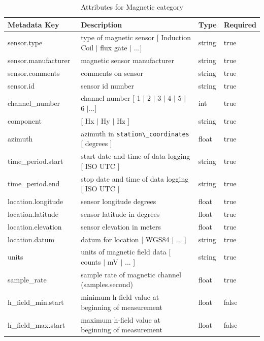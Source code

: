 \documentclass{article}
\begin{document}
\begin{table}[htb!]
    \caption[Attributes for Magnetic Channel]{Attributes for Magnetic category}
    \begin{tabular}{|l|p{3in}|l|l|}
        \hline
        \textbf{Metadata Key} & \textbf{Description} & \textbf{Type} & \textbf{Required} \\ \hline
        sensor.type\ & type of magnetic sensor [ Induction Coil $|$ flux gate $|$ ...] & string & true \\ \hline
        sensor.manufacturer\ & magnetic sensor manufacturer & string &  true \\ \hline
        sensor.comments\ & comments on sensor & string & true \\ \hline
        sensor.id\ & sensor id number & string &  true \\ \hline
        channel\_number\ & channel number [ 1 $|$ 2 $|$ 3 $|$ 4 $|$ 5 $|$ 6 $|$...] & int &  true \\ \hline
        component\ & [ Hx $|$ Hy $|$ Hz ] & string  &  true \\ \hline
        azimuth\ & azimuth in \verb|station\_coordinates| [ degrees ]& float & true \\ \hline
        time\_period.start\ & start date and time of data logging [ ISO UTC ] & string & true \\ \hline
        time\_period.end\ & stop date and time of data logging [ ISO UTC ] & string & true \\ \hline
        location.longitude\ & sensor longitude degrees & float & true \\ \hline
        location.latitude\ & sensor latitude in degrees & float &  true \\ \hline
        location.elevation\ & sensor elevation in meters & float &  true \\ \hline
        location.datum\ & datum for location [ WGS84 $|$ ... ] & string &  true\\ \hline
        units\ & units of magnetic field data [ counts $|$ mV $|$ ... ] & string &  true \\ \hline
        sample\_rate\ & sample rate of magnetic channel (samples.second) & float &  true \\ \hline
        h\_field\_min.start\ & minimum h-field value at beginning of measurement & float &  false \\ \hline
        h\_field\_max.start\ & maximum h-field value at beginning of measurement & float &  false\\ \hline

\end{tabular}
\end{table}
\end{document}
